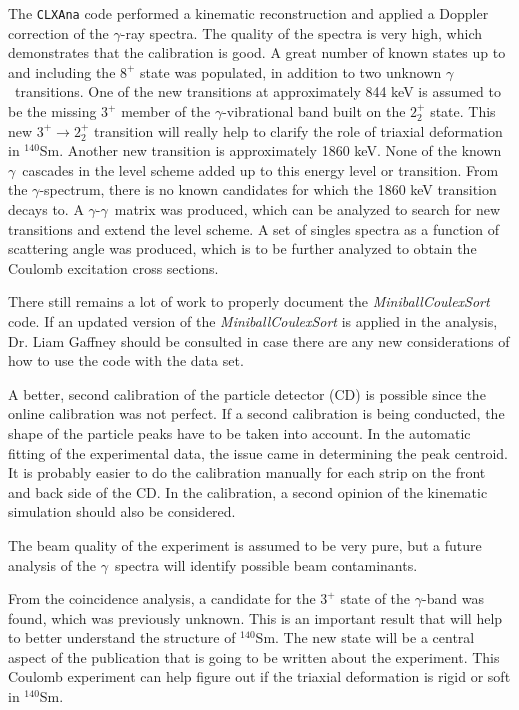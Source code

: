 \documentclass[twoside,english]{uiofysmaster/uiofysmaster}
\newcommand{\Sm}{$^{140}$Sm} %
\newcommand{\ga}{$\gamma$}
\begin{document}
The \texttt{CLXAna} code performed a kinematic reconstruction and applied a Doppler correction of the \ga-ray spectra.
The quality of the spectra is very high, which demonstrates that the calibration is good.
A great number of known states up to and including the $8^+$ state was populated, in addition to two unknown \ga\ transitions. 
One of the new transitions at approximately 844 keV is assumed to be the missing $3^+$ member of the \ga-vibrational band built on the $2_2^+$ state. 
This new $3^+ \rightarrow 2_2^+$ transition will really help to clarify the role of triaxial deformation in \Sm.
Another new transition is approximately 1860 keV. 
None of the known \ga\ cascades in the level scheme added up to this energy level or transition. 
From the \ga-spectrum, there is no known candidates for which the 1860 keV transition decays to.
A \ga-\ga\ matrix was produced, which can be analyzed to search for new transitions and extend the level scheme. 
A set of singles spectra as a function of scattering angle was produced, which is to be further analyzed to obtain the Coulomb excitation cross sections. 


There still remains a lot of work to properly document the \textsl{MiniballCoulexSort} code.
If an updated version of the \textsl{MiniballCoulexSort} is applied in the analysis, Dr. Liam Gaffney should be consulted in case there are any new considerations of how to use the code with the data set.

A better, second calibration of the particle detector (CD) is possible since the online calibration was not perfect.
If a second calibration is being conducted, the shape of the particle peaks have to be taken into account. 
In the automatic fitting of the experimental data, the issue came in determining the peak centroid. 
It is probably easier to do the calibration manually for each strip on the front and back side of the CD.
In the calibration, a second opinion of the kinematic simulation should also be considered.

The beam quality of the experiment is assumed to be very pure, but a future analysis of the \ga\ spectra will identify possible beam contaminants. 

From the coincidence analysis, a candidate for the $3^+$ state of the \ga-band was found, which was previously unknown. 
This is an important result that will help to better understand the structure of \Sm. 
The new state will be a central aspect of the publication that is going to be written about the experiment.
This Coulomb experiment can help figure out if the triaxial deformation is rigid or soft in \Sm.
\end{document}
